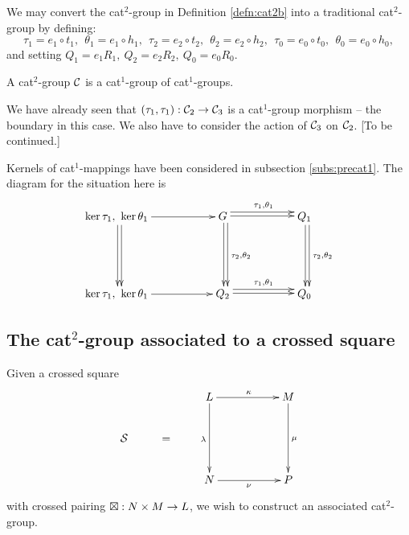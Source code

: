 We may convert the cat$^2$-group in Definition \ref{defn:cat2b} 
into a traditional cat$^2$-group by defining: 
$$
\tau_1 = e_1 \circ t_1,~~ 
\theta_1 = e_1 \circ h_1,~~ 
\tau_2 = e_2 \circ t_2,~~ 
\theta_2 = e_2 \circ h_2,~~ 
\tau_0 = e_0 \circ t_0,~~ 
\theta_0 = e_0 \circ h_0, 
$$ 
and setting  $Q_1 = e_1R_1,~ Q_2 = e_2R_2,~ Q_0 = e_0R_0$. 

\bigskip 
\begin{prop} \label{prop:cat2c} 
A cat$^2$-group $\mathcal{C}$ is a cat$^1$-group of cat$^1$-groups. 
\end{prop} 
\begin{pf} 
We have already seen that $(\tau_1,\tau_1) : \mathcal{C}_2 \to \mathcal{C}_3$ 
is a cat$^1$-group morphism -- the boundary in this case. 
We also have to consider the action of $\mathcal{C}_3$ on $\mathcal{C}_2$. 
[To be continued.]
\end{pf}

\vspace*{25mm}
Kernels of cat$^1$-mappings have been considered in 
subsection \ref{subs:precat1}. 
The diagram for the situation here is 
\begin{equation*} \label{eq:cat2cker}
\vcenter{\xymatrix{
   \ker\tau_1,\ \ker\theta_1 \ar[rr] \ar[dd]<1.0ex> \ar[dd]<0.2ex> 
     && G \ar[dd]<1.0ex>^{\tau_2,\theta_2} \ar[dd]<0.2ex> 
          \ar[rr]<1.0ex>^{\tau_1,\theta_1} \ar[rr]<0.2ex> 
        && Q_1 \ar[dd]<1.0ex>^{\tau_2,\theta_2} \ar[dd]<0.2ex>  \\
     &&  \\
   \ker\tau_1,\ \ker\theta_1 \ar[rr] 
     && Q_2  \ar[rr]<1.0ex>^{\tau_1,\theta_1} \ar[rr]<0.2ex>
        && Q_0
}}
\end{equation*}


\newpage
\subsection{The cat$^2$-group associated to a crossed square} 
\label{sect:cat2-xsq}


Given a crossed square
\begin{equation} \label{eq:Ssquare2cat2}
\vcenter{\xymatrix{
        &   &    L \ar[rr]^{\kappa} \ar[dd]_{\lambda}
             &&  M \ar[dd]^{\mu} \\
  \calS & = &&&  \\
        &   &    N \ar[rr]_{\nu}
             &&  P
}}
\end{equation}
with crossed pairing $\boxtimes: N \times M \to L$, 
we wish to construct an associated cat$^2$-group.

